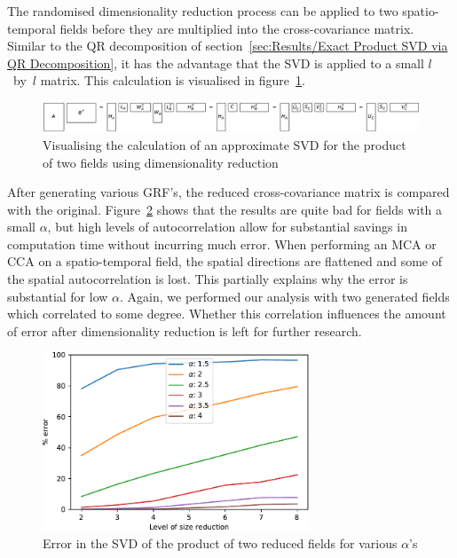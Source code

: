 \documentclass[ijgi,article,submit,moreauthors,pdftex,10pt,a4paper]{Definitions/mdpi}
\begin{document}
The randomised dimensionality reduction process can be applied to two spatio-temporal fields before they are multiplied into the cross-covariance matrix. Similar to the QR decomposition of section~\ref{sec:Results/Exact Product SVD via QR Decomposition}, it has the advantage that the SVD is applied to a small $l$~by~$l$ matrix. This calculation is visualised in figure~\ref{fig:randomisedSquareProductSVD}.

\begin{figure}[H]
\centering
\includegraphics[width=\textwidth]{Results/randomisedSquareProductSVD.pdf}
\caption[Approximate product SVD]{Visualising the calculation of an approximate SVD for the product of two fields using dimensionality reduction}
\label{fig:randomisedSquareProductSVD}
\end{figure}

After generating various GRF's, the reduced cross-covariance matrix is compared with the original. Figure~\ref{fig:plotRandomisedSizeReducedMatrixProduct} shows that the results are quite bad for fields with a small $\alpha$, but high levels of autocorrelation allow for substantial savings in computation time without incurring much error. When performing an MCA or CCA on a spatio-temporal field, the spatial directions are flattened and some of the spatial autocorrelation is lost. This partially explains why the error is substantial for low $\alpha$. Again, we performed our analysis with two generated fields which correlated to some degree. Whether this correlation influences the amount of error after dimensionality reduction is left for further research.

\begin{figure}[H]
\centering
\includegraphics[width=80mm]{Results/plotRandomisedSizeReducedMatrixProduct.pdf}
\caption[Error after reduction]{Error in the SVD of the product of two reduced fields for various $\alpha$'s}
\label{fig:plotRandomisedSizeReducedMatrixProduct}
\end{figure}
\end{document}

